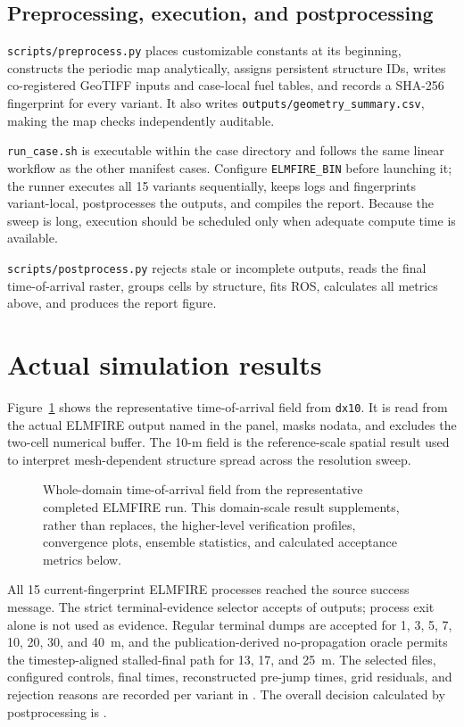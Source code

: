 \subsection{Preprocessing, execution, and postprocessing}

\texttt{scripts/preprocess.py} places customizable constants at its beginning,
constructs the periodic map analytically, assigns persistent structure IDs,
writes co-registered GeoTIFF inputs and case-local fuel tables, and records a
SHA-256 fingerprint for every variant. It also writes
\texttt{outputs/geometry\_summary.csv}, making the map checks independently
auditable.

\texttt{run\_case.sh} is executable within the case directory and follows the same linear workflow as the other manifest cases. Configure \texttt{ELMFIRE\_BIN} before launching it; the runner executes all 15 variants sequentially, keeps logs and fingerprints variant-local, postprocesses the outputs, and compiles the report. Because the sweep is long, execution should be scheduled only when adequate compute time is available.

\texttt{scripts/postprocess.py} rejects stale or incomplete outputs, reads the
final time-of-arrival raster, groups cells by structure, fits ROS, calculates
all metrics above, and produces the report figure.

\section{Actual simulation results}

Figure~\ref{fig:domain-result} shows the representative time-of-arrival field from \texttt{dx10}.
It is read from the actual ELMFIRE output named in the panel, masks nodata, and excludes
the two-cell numerical buffer.  The 10-m field is the reference-scale spatial result used to interpret mesh-dependent structure spread across the resolution sweep.

\begin{figure}[H]
\centering
{}
\caption{Whole-domain time-of-arrival field from the representative completed ELMFIRE run.  This
domain-scale result supplements, rather than replaces, the higher-level verification
profiles, convergence plots, ensemble statistics, and calculated acceptance metrics below.}
\label{fig:domain-result}
\end{figure}


All 15 current-fingerprint ELMFIRE processes reached the source success
message.  The strict terminal-evidence selector accepts
\CompletedVariantCount{} of \RequestedVariantCount{} outputs; process exit alone is
not used as evidence.  Regular terminal dumps are accepted for 1, 3, 5, 7, 10,
20, 30, and 40~m, and the publication-derived no-propagation oracle permits the
timestep-aligned stalled-final path for 13, 17, and 25~m.  The selected files,
configured controls, final times, reconstructed pre-jump times, grid residuals,
and rejection reasons are recorded per variant in
. The overall decision calculated by postprocessing is
\textbf{\OverallStatus}.

